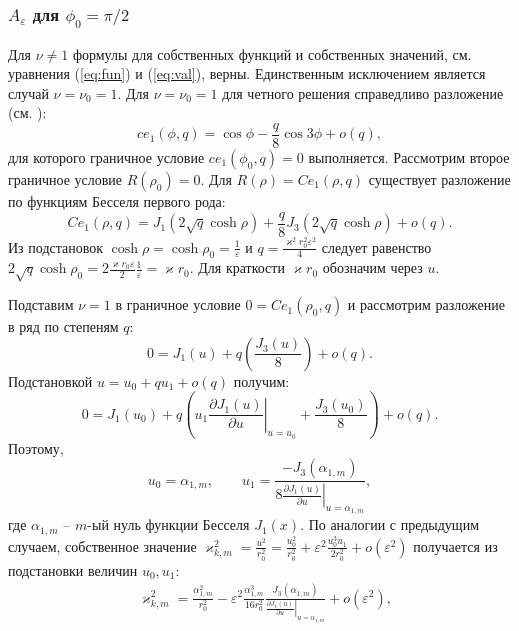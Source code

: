 \subsubsection{$A_\varepsilon$ для $\phi_0=\pi/2$}\label{sec:ch2/sec2/sub3/sub1}


Для $\nu\ne 1$ формулы для собственных функций и собственных значений, см. уравнения (\ref{eq:fun}) и (\ref{eq:val}), верны. Единственным исключением является случай  $\nu=\nu_0=1$.
Для $\nu=\nu_0=1$ для четного решения справедливо разложение (см. \cite[Subsect.~20.2.27]{wref2}):
\begin{equation*}
ce_1(\phi, q) = 	\cos{\phi}  - \frac{q}{8} \cos{3\phi} + o(q),
 \end{equation*}
для которого граничное условие  $ce_1(\phi_0, q)=0$ выполняется. 
Рассмотрим второе граничное условие $R(\rho_0) = 0$.
Для $R(\rho) = Ce_1(\rho, q)$ существует разложение по функциям Бесселя первого рода:
\begin{equation*}
Ce_1(\rho, q) = J_1(2\sqrt{q} \cosh{\rho}) + \frac{q}{8} J_3(2\sqrt{q}\cosh{\rho}) + o(q).
\end{equation*}
Из подстановок $\cosh\rho = \cosh\rho_0 =  \frac{1}{\varepsilon}$ и $q = \frac{\varkappa^2 r_0^2 \varepsilon^2}{4}$ следует равенство
$2\sqrt{q} \cosh{\rho_0} = 2 \frac{\varkappa r_0 \varepsilon}{2} \frac{1}{\varepsilon} = \varkappa r_0$. Для краткости $\varkappa r_0$ обозначим через $u$. 

Подставим $\nu = 1$ в граничное условие $0 = Ce_1(\rho_0, q)$ и рассмотрим разложение в ряд по степеням   $q$:
\begin{equation*}
    0 = J_1(u) + q \left( \frac{J_3(u)}{8} \right) + o(q).
\end{equation*}
Подстановкой  $u = u_0 + q u_1 + o(q)$ получим:
\begin{equation*}
    0 = 
    J_1(u_0) + q \left( 
    u_1 \left.\frac{\partial J_1 (u)}{\partial u}\right|_{u=u_0}
    + \frac{J_3(u_0)}{8}
    \right) + o(q).
\end{equation*}
Поэтому, 
\begin{equation*}
u_0 = \alpha_{1, m}, \qquad u_1 = 
\frac{ - J_3(\alpha_{1, m}) }{8\left.
\frac{\partial J_1 (u)}{\partial u}\right|_{u=\alpha_{1, m}}},
\end{equation*}
где $\alpha_{1, m}$ -- $m$-ый нуль функции Бесселя  $J_1(x)$. По аналогии с предыдущим случаем,
собственное значение $\varkappa_{k, m}^2 = \frac{u^2}{r_0^2} = \frac{u_0^2}{r_0^2} + \varepsilon^2 \frac{u_0^3 u_1}{2r_0^2} + o(\varepsilon^2)$ получается из подстановки величин  $u_0, u_1$:
\begin{align}
   & \varkappa_{k, m}^2 = \frac{\alpha_{1, m}^2}{r_0^2} - \varepsilon^2 \frac{\alpha_{1, m}^3}{16r_0^2} 
    \frac{J_3(\alpha_{1, m})}{\left.\frac{\partial J_1 (u)}{\partial u}\right|_{u=\alpha_{1, m}}} 
    + o(\varepsilon^2), \label{eq:valS1}
    \end{align}



